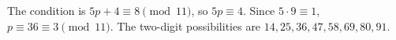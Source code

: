 The condition is $5p+4\equiv8\pmod{11}$, so $5p\equiv4$. Since $5\cdot9\equiv1$, $p\equiv36\equiv3\pmod{11}$. The two-digit possibilities are $\boxed{14,25,36,47,58,69,80,91}$.
